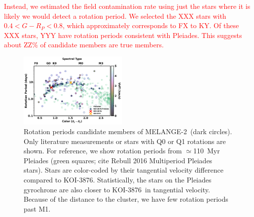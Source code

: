 \documentclass[twocolumn]{aastex631}
\newcommand{\starname}{KOI-3876}
\newcommand{\kepler}{{\it Kepler}}
\newcommand{\tess}{\textit{TESS}}
\newcommand{\gaia}{{\textit Gaia}}
\newcommand{\association}{MELANGE-2}
\begin{document}
\textcolor{red}{Instead, we estimated the field contamination rate using just the stars where it is likely we would detect a rotation period. We selected the XXX stars with $0.4<G-R_P<0.8$, which approximately corresponds to FX to KY. Of these XXX stars, YYY have rotation periods consistent with Pleiades. This suggests about ZZ\% of candidate members are true members. }




\begin{figure}[tbh]
    \centering
    \includegraphics[width=0.47\textwidth, scale = 1.1]{koi3876_cp-seq_final2.pdf}
    \caption{Rotation periods candidate members of \association\ (dark circles). Only literature measurements or stars with Q0 or Q1 rotations are shown. For reference, we show rotation periods from $\simeq$110\, Myr Pleiades (green squares; cite Rebull 2016 Multiperiod Pleiades stars). Stars are color-coded by their tangential velocity difference compared to \starname. Statistically, the stars on the Pleiades gyrochrone are also closer to \starname\ in tangential velocity. Because of the distance to the cluster, we have few rotation periods past M1. 
    \label{fig:rotation}
    }
\end{figure} 





\end{document}
